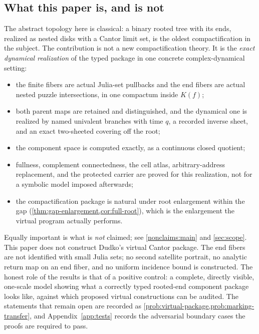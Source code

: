 \documentclass[11pt,reqno]{amsart}
\numberwithin{equation}{section}
\theoremstyle{plain}
\theoremstyle{definition}
\theoremstyle{remark}
\begin{document}
\subsection{What this paper is, and is not}

The abstract topology here is classical: a binary rooted tree with its
ends, realized as nested disks with a Cantor limit set, is the oldest
compactification in the subject.  The contribution is not a new
compactification theory.  It is the \emph{exact dynamical realization} of
the typed package in one concrete complex-dynamical setting:

\begin{itemize}[leftmargin=2em]
 \item the finite fibers are actual Julia-set pullbacks and the end
  fibers are actual nested puzzle intersections, in one compactum inside
  $K(f)$;
 \item both parent maps are retained and distinguished, and the
  dynamical one is realized by named univalent branches with time $q$,
  a recorded inverse sheet, and an exact two-sheeted covering off the
  root;
 \item the component space is computed exactly, as a continuous closed
  quotient;
 \item fullness, complement connectedness, the cell atlas,
  arbitrary-address replacement, and the protected carrier are proved
  for this realization, not for a symbolic model imposed afterwards;
 \item the compactification package is natural under root enlargement
  within the gap (\cref{thm:gap-enlargement,cor:full-root}), which is
  the enlargement the virtual program actually performs.
\end{itemize}

Equally important is what is \emph{not} claimed; see
\cref{nonclaims:main} and \cref{sec:scope}.  This paper does not
construct Dudko's virtual Cantor package.  The end fibers are not
identified with small Julia sets; no second satellite portrait, no
analytic return map on an end fiber, and no uniform incidence bound is
constructed.  The honest role of the results is that of a positive
control: a complete, directly visible, one-scale model showing what a
correctly typed rooted-end component package looks like, against which
proposed virtual constructions can be audited.  The statements that
remain open are recorded as
\cref{prob:virtual-package,prob:marking-transfer}, and
Appendix~\ref{app:tests} records the adversarial boundary cases the
proofs are required to pass.
\end{document}
